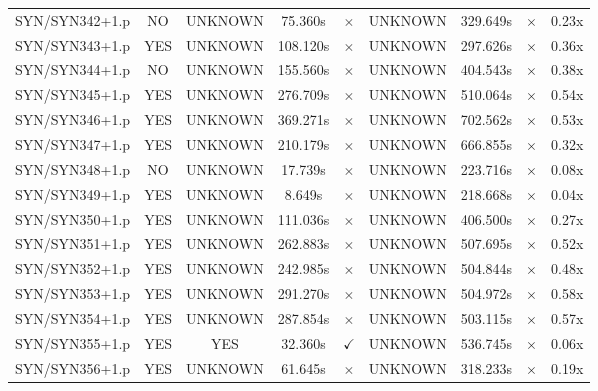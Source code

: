 \documentclass[a4paper,10pt]{article}
\begin{document}
\begin{longtable}{lcccccccc}
SYN/SYN342+1.p & NO & UNKNOWN & 75.360s & \cellcolor{mismatchcolor}$\times$ & UNKNOWN & 329.649s & \cellcolor{mismatchcolor}$\times$ & 0.23x \\
SYN/SYN343+1.p & YES & UNKNOWN & 108.120s & \cellcolor{mismatchcolor}$\times$ & UNKNOWN & 297.626s & \cellcolor{mismatchcolor}$\times$ & 0.36x \\
SYN/SYN344+1.p & NO & UNKNOWN & 155.560s & \cellcolor{mismatchcolor}$\times$ & UNKNOWN & 404.543s & \cellcolor{mismatchcolor}$\times$ & 0.38x \\
SYN/SYN345+1.p & YES & UNKNOWN & 276.709s & \cellcolor{mismatchcolor}$\times$ & UNKNOWN & 510.064s & \cellcolor{mismatchcolor}$\times$ & 0.54x \\
SYN/SYN346+1.p & YES & UNKNOWN & 369.271s & \cellcolor{mismatchcolor}$\times$ & UNKNOWN & 702.562s & \cellcolor{mismatchcolor}$\times$ & 0.53x \\
SYN/SYN347+1.p & YES & UNKNOWN & 210.179s & \cellcolor{mismatchcolor}$\times$ & UNKNOWN & 666.855s & \cellcolor{mismatchcolor}$\times$ & 0.32x \\
SYN/SYN348+1.p & NO & UNKNOWN & 17.739s & \cellcolor{mismatchcolor}$\times$ & UNKNOWN & 223.716s & \cellcolor{mismatchcolor}$\times$ & 0.08x \\
SYN/SYN349+1.p & YES & UNKNOWN & 8.649s & \cellcolor{mismatchcolor}$\times$ & UNKNOWN & 218.668s & \cellcolor{mismatchcolor}$\times$ & 0.04x \\
SYN/SYN350+1.p & YES & UNKNOWN & 111.036s & \cellcolor{mismatchcolor}$\times$ & UNKNOWN & 406.500s & \cellcolor{mismatchcolor}$\times$ & 0.27x \\
SYN/SYN351+1.p & YES & UNKNOWN & 262.883s & \cellcolor{mismatchcolor}$\times$ & UNKNOWN & 507.695s & \cellcolor{mismatchcolor}$\times$ & 0.52x \\
SYN/SYN352+1.p & YES & UNKNOWN & 242.985s & \cellcolor{mismatchcolor}$\times$ & UNKNOWN & 504.844s & \cellcolor{mismatchcolor}$\times$ & 0.48x \\
SYN/SYN353+1.p & YES & UNKNOWN & 291.270s & \cellcolor{mismatchcolor}$\times$ & UNKNOWN & 504.972s & \cellcolor{mismatchcolor}$\times$ & 0.58x \\
SYN/SYN354+1.p & YES & UNKNOWN & 287.854s & \cellcolor{mismatchcolor}$\times$ & UNKNOWN & 503.115s & \cellcolor{mismatchcolor}$\times$ & 0.57x \\
SYN/SYN355+1.p & YES & YES & 32.360s & \cellcolor{matchcolor}$\checkmark$ & UNKNOWN & 536.745s & \cellcolor{mismatchcolor}$\times$ & 0.06x \\
SYN/SYN356+1.p & YES & UNKNOWN & 61.645s & \cellcolor{mismatchcolor}$\times$ & UNKNOWN & 318.233s & \cellcolor{mismatchcolor}$\times$ & 0.19x \\

\end{longtable}
\end{document}
